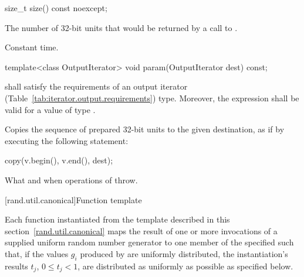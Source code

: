 %
%
\begin{itemdecl}
size_t size() const noexcept;
\end{itemdecl}

\begin{itemdescr}
\pnum\returns The number of 32-bit units
 that would be returned
 by a call to .

\pnum\complexity Constant time.
\end{itemdescr}

%
%
\begin{itemdecl}
template<class OutputIterator>
  void param(OutputIterator dest) const;
\end{itemdecl}

\begin{itemdescr}
\pnum\requires
   shall satisfy the requirements
  of an output iterator (Table~\ref{tab:iterator.output.requirements}) type.
  Moreover,
  the expression
  shall be valid for a value  of type .

\pnum\effects Copies the sequence of prepared 32-bit units
 to the given destination,
 as if by executing the following statement:
\begin{codeblock}
copy(v.begin(), v.end(), dest);
\end{codeblock}

\pnum\throws
What and when  operations of  throw.
\end{itemdescr}


[rand.util.canonical]{Function template }%
%

\pnum
 Each function instantiated
 from the template
 described in this section~\ref{rand.util.canonical}
 maps the result of one or more invocations
 of a supplied uniform random number generator 
 to one member
 of the specified 
 such that,
 if the values $g_i$
 produced by 
 are uniformly distributed,
 the instantiation's results
 $t_j$, $ 0 \leq t_j < 1 $,
 are distributed as uniformly as possible
 as specified below.

